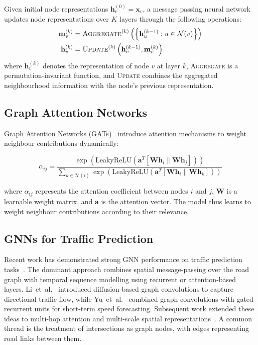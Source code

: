 \begin{definition}
Given initial node representations $\mathbf{h}_v^{(0)} = \mathbf{x}_v$, a message passing neural network updates node representations over $K$ layers through the following operations:
\begin{align}
    \mathbf{m}_v^{(k)} &= \text{\textsc{Aggregate}}^{(k)}\left(\left\{\mathbf{h}_u^{(k-1)} : u \in \mathcal{N}(v)\right\}\right) \label{eq:aggregate}\\
    \mathbf{h}_v^{(k)} &= \text{\textsc{Update}}^{(k)}\left(\mathbf{h}_v^{(k-1)}, \mathbf{m}_v^{(k)}\right) \label{eq:update}
\end{align}
where $\mathbf{h}_v^{(k)}$ denotes the representation of node $v$ at layer $k$, \textsc{Aggregate} is a permutation-invariant function, and \textsc{Update} combines the aggregated neighbourhood information with the node's previous representation.
\end{definition}

\subsection{Graph Attention Networks}

Graph Attention Networks (GATs)~\cite{velickovic2018graph} introduce attention mechanisms to weight neighbour contributions dynamically:

\begin{equation}
    \alpha_{ij} = \frac{\exp\left(\text{LeakyReLU}\left(\mathbf{a}^T[\mathbf{W}\mathbf{h}_i \| \mathbf{W}\mathbf{h}_j]\right)\right)}{\sum_{k \in \mathcal{N}(i)} \exp\left(\text{LeakyReLU}\left(\mathbf{a}^T[\mathbf{W}\mathbf{h}_i \| \mathbf{W}\mathbf{h}_k]\right)\right)}
\end{equation}

where $\alpha_{ij}$ represents the attention coefficient between nodes $i$ and $j$, $\mathbf{W}$ is a learnable weight matrix, and $\mathbf{a}$ is the attention vector. The model thus learns to weight neighbour contributions according to their relevance.

\subsection{GNNs for Traffic Prediction}

Recent work has demonstrated strong GNN performance on traffic prediction tasks~\cite{li2018diffusion, yu2018spatio, zhao2020tgcn, jiang2022graph}. The dominant approach combines spatial message-passing over the road graph with temporal sequence modelling using recurrent or attention-based layers. Li~et~al.~\cite{li2018diffusion} introduced diffusion-based graph convolutions to capture directional traffic flow, while Yu~et~al.~\cite{yu2018spatio} combined graph convolutions with gated recurrent units for short-term speed forecasting. Subsequent work extended these ideas to multi-hop attention and multi-scale spatial representations~\cite{jiang2022graph}. A common thread is the treatment of intersections as graph nodes, with edges representing road links between them.


